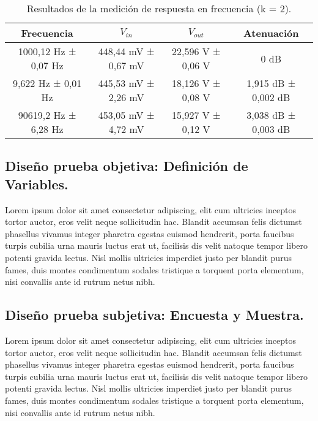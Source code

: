 \begin{table}[h]
	\centering
	\caption{Resultados de la medición de respuesta en frecuencia (k = 2).}
	\begin{tabular}{cccc}
		\hline
		\textbf{Frecuencia}&\textbf{$V_{in}$}&\textbf{$V_{out}$}&\textbf{Atenuación}\\\hline
		
		1000,12 Hz ± 0,07 Hz & 448,44 mV ± 0,67 mV & 22,596 V ± 0,06 V &       0 dB \\\hline
		
		9,622 Hz ± 0,01 Hz & 445,53 mV ± 2,26 mV & 18,126 V ± 0,08 V & 1,915 dB  ± 0,002 dB \\\hline
		
		90619,2 Hz ± 6,28 Hz & 453,05 mV ± 4,72 mV & 15,927 V ± 0,12 V & 3,038 dB  ± 0,003 dB \\\hline
		
	\end{tabular}  
	\label{tab:FrecRang}
\end{table}

\subsection{Diseño prueba objetiva: Definición de Variables.}
Lorem ipsum dolor sit amet consectetur adipiscing, elit cum ultricies inceptos tortor auctor, eros velit neque sollicitudin hac. Blandit accumsan felis dictumst phasellus vivamus integer pharetra egestas euismod hendrerit, porta faucibus turpis cubilia urna mauris luctus erat ut, facilisis dis velit natoque tempor libero potenti gravida lectus. Nisl mollis ultricies imperdiet justo per blandit purus fames, duis montes condimentum sodales tristique a torquent porta elementum, nisi convallis ante id rutrum netus nibh.

\subsection{Diseño prueba subjetiva: Encuesta y Muestra.}
Lorem ipsum dolor sit amet consectetur adipiscing, elit cum ultricies inceptos tortor auctor, eros velit neque sollicitudin hac. Blandit accumsan felis dictumst phasellus vivamus integer pharetra egestas euismod hendrerit, porta faucibus turpis cubilia urna mauris luctus erat ut, facilisis dis velit natoque tempor libero potenti gravida lectus. Nisl mollis ultricies imperdiet justo per blandit purus fames, duis montes condimentum sodales tristique a torquent porta elementum, nisi convallis ante id rutrum netus nibh. 


